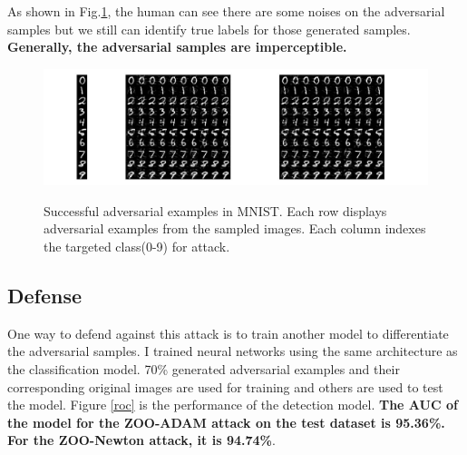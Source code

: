 \documentclass[a4paper]{article}
\begin{document}
As shown in Fig.\ref{ae}, the human can see there are some noises on the adversarial samples but we still can identify true labels for those generated samples. \textbf{Generally, the adversarial samples are imperceptible.}
\begin{figure}
\centering
\includegraphics[scale=0.3]{resjpg.jpg}
\label{ae}
\caption{Successful adversarial examples in MNIST. Each row displays adversarial examples from the sampled images. Each column indexes the targeted class(0-9) for attack.}
\end{figure}

\subsection{Defense}
One way to defend against this attack is to train another model to differentiate the adversarial samples.
I trained neural networks using the same architecture as the classification model. 70\% generated adversarial examples and their corresponding original images are used for training and others are used to test the model. 
Figure \ref{roc} is the performance of the detection model. \textbf{The AUC of the model for the ZOO-ADAM attack on the test dataset is 95.36\%. For the ZOO-Newton attack, it is 94.74\%}.
\end{document}
